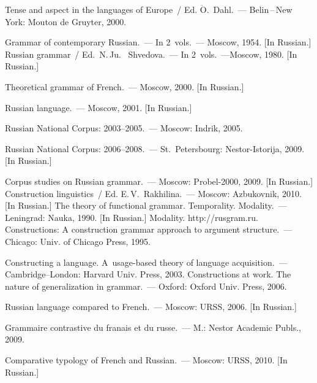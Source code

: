\begin{multicols}{2}
{{\begin{thebibliography}{99}
Tense and aspect in the languages of Europe~/ Ed. $\ddot{\mbox{O}}$.~Dahl.~--- 
Belin\,--\,New York: Mouton de Gruyter, 2000.

Grammar of contemporary Russian.~--- 
In 2~vols.~--- Moscow, 1954. [In Russian.]
Russian grammar~/ Ed.\ N.\,Ju.~ Shvedova.~--- In 2~vols.~---Moscow, 
1980. [In Russian.]

 Theoretical grammar of 
French.~--- Moscow, 2000. [In Russian.]

Russian language.~--- Moscow, 2001.  [In Russian.]

 
Russian National Corpus: 2003--2005.~--- Moscow: Indrik, 2005. 

Russian National Corpus: 2006--2008.~--- St.\ 
Petersbourg: Nestor-Istorija, 2009. [In Russian.]
 
Corpus studies on Russian grammar.~--- 
Moscow: Probel-2000, 2009. [In Russian.]
Construction linguistics~/ Ed. E.\,V.~Rakhilina.~--- Moscow: Azbukovnik, 
2010. [In Russian.]
The theory of functional 
grammar. Temporality. Modality.~--- Leningrad: Nauka, 1990. [In Russian.]
\bibitem{24-zat}
 Modality.  {\sf http://rusgram.ru}.
 Constructions: A construction grammar approach to argument structure.~--- 
Chicago: Univ. of Chicago Press, 1995.

 Constructing a language. A~usage-based theory of language acquisition.~--- 
Cambridge--London: Harvard Univ. Press, 2003.
 Constructions at work. The nature of generalization in grammar.~--- Oxford: 
Oxford Univ. Press, 2006.

 Russian language compared to 
French.~--- Moscow: URSS, 2006. [In Russian.]



 Grammaire contrastive du fran{\!}ais et du russe.~--- M.: 
Nestor Academic Publs., 2009.

 Comparative typology 
of French and Russian.~--- Moscow: URSS, 2010. [In Russian.]


\end{thebibliography}}}
\end{multicols}
